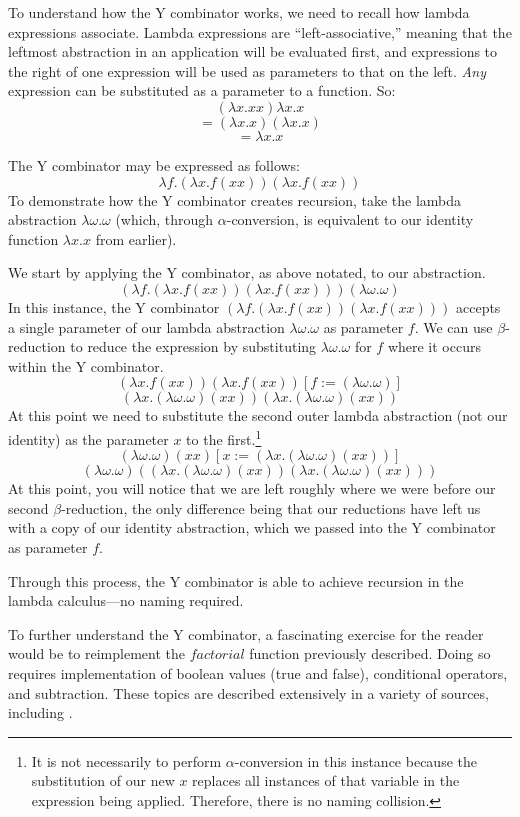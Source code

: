 \documentclass[twocolumn,titlepage,12pt]{article}
\begin{document}
To understand how the Y combinator works, we need to recall how lambda expressions associate. Lambda expressions are ``left-associative,'' meaning that the leftmost abstraction in an application will be evaluated first, and expressions to the right of one expression will be used as parameters to that on the left. \textit{Any} expression can be substituted as a parameter to a function. So:
$$(\lambda x.xx)\lambda x.x$$
$$=(\lambda x.x)(\lambda x.x)$$
$$=\lambda x.x$$

The Y combinator may be expressed as follows:
$$\lambda f.(\lambda x.f(x x))(\lambda x.f(x x))$$
To demonstrate how the Y combinator creates recursion, take the lambda abstraction $\lambda \omega.\omega$ (which, through $\alpha$-conversion, is equivalent to our identity function $\lambda x.x$ from earlier).

We start by applying the Y combinator, as above notated, to our abstraction.
$$(\lambda f.(\lambda x.f(x x))(\lambda x.f(x x)))(\lambda \omega.\omega)$$
In this instance, the Y combinator $(\lambda f.(\lambda x.f(x x))(\lambda x.f(x x)))$ accepts a single parameter of our lambda abstraction $\lambda \omega.\omega$ as parameter $f$. We can use $\beta$-reduction to reduce the expression by substituting $\lambda \omega.\omega$ for $f$ where it occurs within the Y combinator.
$$(\lambda x.f(x x))(\lambda x.f(x x))[f:=(\lambda \omega.\omega)]$$
$$(\lambda x.(\lambda \omega.\omega)(x x))(\lambda x.(\lambda \omega.\omega)(x x))$$
At this point we need to substitute the second outer lambda abstraction (not our identity) as the parameter $x$ to the first.\footnote{It is not necessarily to perform $\alpha$-conversion in this instance because the substitution of our new $x$ replaces all instances of that variable in the expression being applied. Therefore, there is no naming collision.}
$$(\lambda \omega.\omega)(x x)[x:=(\lambda x.(\lambda \omega.\omega)(x x))]$$
$$(\lambda \omega.\omega)((\lambda x.(\lambda \omega.\omega)(x x))(\lambda x.(\lambda \omega.\omega)(x x)))$$
At this point, you will notice that we are left roughly where we were before our second $\beta$-reduction, the only difference being that our reductions have left us with a copy of our identity abstraction, which we passed into the Y combinator as parameter $f$.

Through this process, the Y combinator is able to achieve recursion in the lambda calculus---no naming required.

To further understand the Y combinator, a fascinating exercise for the reader would be to reimplement the $factorial$ function previously described. Doing so requires implementation of boolean values (true and false), conditional operators, and subtraction. These topics are described extensively in a variety of sources, including \cite{stanfordlc}\cite{cornelllc}.
\end{document}
